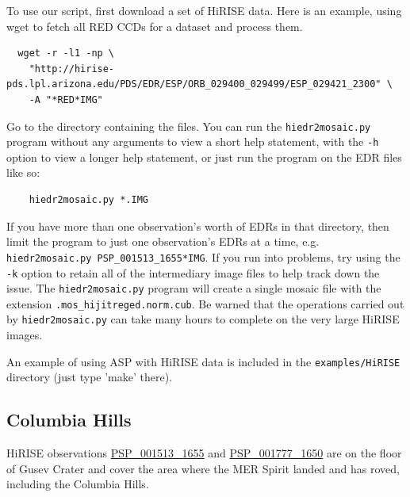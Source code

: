 To use our script, first download a set of HiRISE data. Here is
an example, using wget to fetch all RED CCDs for a dataset and
process them.

\begin{verbatim}
  wget -r -l1 -np \
    "http://hirise-pds.lpl.arizona.edu/PDS/EDR/ESP/ORB_029400_029499/ESP_029421_2300" \
    -A "*RED*IMG"
\end{verbatim}

Go to the directory containing the files. You can run the
\texttt{hiedr2mosaic.py} program without any arguments to view a short
help statement, with the \texttt{-h} option to view a longer help statement,
or just run the program on the EDR files like so:

\begin{verbatim}
    hiedr2mosaic.py *.IMG
\end{verbatim}

If you have more than one observation's worth of EDRs in that
directory, then limit the program to just one observation's EDRs
at a time, e.g. \texttt{hiedr2mosaic.py PSP\_001513\_1655*IMG}.  If you
run into problems, try using the \texttt{-k} option to retain all of
the intermediary image files to help track down the issue.  The
\texttt{hiedr2mosaic.py} program will create a single mosaic file
with the extension \texttt{.mos\_hijitreged.norm.cub}.  Be warned that
the operations carried out by \texttt{hiedr2mosaic.py} can take many
hours to complete on the very large HiRISE images.

An example of using ASP with HiRISE data is included in the
\texttt{examples/HiRISE} directory (just type 'make' there).

\subsection{Columbia Hills}


\ac{HiRISE} observations
\href{http://hirise.lpl.arizona.edu/PSP_001513_1655}{PSP\_001513\_1655} and
\href{http://hirise.lpl.arizona.edu/PSP_001777_1650}{PSP\_001777\_1650}
are on the floor of Gusev Crater and cover the area where the \ac{MER}
Spirit landed and has roved, including the Columbia Hills.

